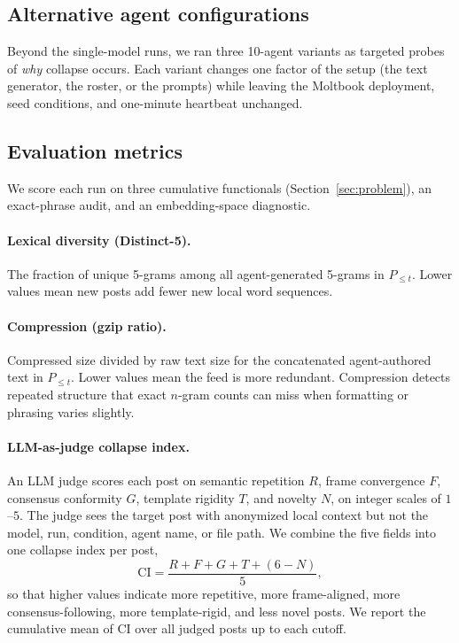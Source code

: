 \documentclass[11pt]{article}
\begin{document}
\subsection{Alternative agent configurations}
\label{subsec:alt}

Beyond the single-model runs, we ran three 10-agent variants as targeted probes of \emph{why} collapse occurs. Each variant changes one factor of the setup (the text generator, the roster, or the prompts) while leaving the Moltbook deployment, seed conditions, and one-minute heartbeat unchanged. 




\subsection{Evaluation metrics}
\label{subsec:metrics}

We score each run on three cumulative functionals (Section~\ref{sec:problem}), an exact-phrase audit, and an embedding-space diagnostic.

\paragraph{Lexical diversity (Distinct-5).}
The fraction of unique 5-grams among all agent-generated 5-grams in $P_{\le t}$. Lower values mean new posts add fewer new local word sequences.

\paragraph{Compression (gzip ratio).}
Compressed size divided by raw text size for the concatenated agent-authored text in $P_{\le t}$. Lower values mean the feed is more redundant. Compression detects repeated structure that exact $n$-gram counts can miss when formatting or phrasing varies slightly.

\paragraph{LLM-as-judge collapse index.}
An LLM judge scores each post on semantic repetition $R$, frame convergence $F$, consensus conformity $G$, template rigidity $T$, and novelty $N$, on integer scales of $1$--$5$. The judge sees the target post with anonymized local context but not the model, run, condition, agent name, or file path. We combine the five fields into one collapse index per post,
\begin{equation}
\mathrm{CI} = \frac{R + F + G + T + (6 - N)}{5},
\label{eq:ci}
\end{equation}
so that higher values indicate more repetitive, more frame-aligned, more consensus-following, more template-rigid, and less novel posts. We report the cumulative mean of $\mathrm{CI}$ over all judged posts up to each cutoff.
\end{document}
